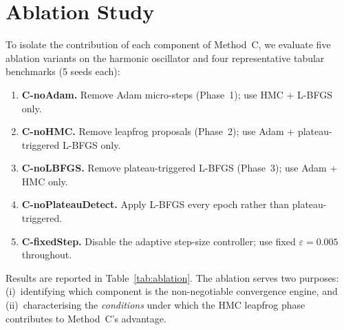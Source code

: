 \documentclass[11pt]{article}
\theoremstyle{definition}
\begin{document}

\section{Ablation Study}
\label{sec:ablation}

To isolate the contribution of each component of Method~C, we
evaluate five ablation variants on the harmonic oscillator and four
representative tabular benchmarks (5 seeds each):

\begin{enumerate}[label=\textbf{Abl-\arabic*.},leftmargin=*]

  \item \textbf{C-noAdam.} Remove Adam micro-steps (Phase~1); use
        HMC + L-BFGS only.

  \item \textbf{C-noHMC.} Remove leapfrog proposals (Phase~2); use
        Adam + plateau-triggered L-BFGS only.

  \item \textbf{C-noLBFGS.} Remove plateau-triggered L-BFGS
        (Phase~3); use Adam + HMC only.

  \item \textbf{C-noPlateauDetect.} Apply L-BFGS every epoch rather
        than plateau-triggered.

  \item \textbf{C-fixedStep.} Disable the adaptive step-size
        controller; use fixed $\varepsilon=0.005$ throughout.

\end{enumerate}

Results are reported in Table~\ref{tab:ablation}.  The ablation
serves two purposes: (i)~identifying which component is the
non-negotiable convergence engine, and (ii)~characterising the
\emph{conditions} under which the HMC leapfrog phase contributes
to Method~C's advantage.
\end{document}
